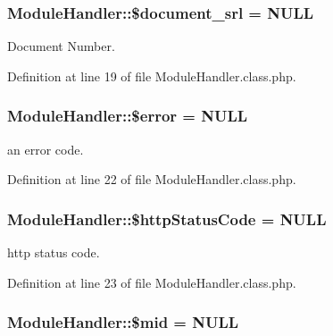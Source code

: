 \subsubsection[{\texorpdfstring{\$document\+\_\+srl}{$document_srl}}]{\setlength{\rightskip}{0pt plus 5cm}Module\+Handler\+::\$document\+\_\+srl = N\+U\+LL}\hypertarget{classModuleHandler_acf9f6062042025aab6a7e10f6b261909}{}\label{classModuleHandler_acf9f6062042025aab6a7e10f6b261909}


Document Number. 



Definition at line 19 of file Module\+Handler.\+class.\+php.

\subsubsection[{\texorpdfstring{\$error}{$error}}]{\setlength{\rightskip}{0pt plus 5cm}Module\+Handler\+::\$error = N\+U\+LL}\hypertarget{classModuleHandler_ad81b78f21e42724e73da6808c561159c}{}\label{classModuleHandler_ad81b78f21e42724e73da6808c561159c}


an error code. 



Definition at line 22 of file Module\+Handler.\+class.\+php.

\subsubsection[{\texorpdfstring{\$http\+Status\+Code}{$httpStatusCode}}]{\setlength{\rightskip}{0pt plus 5cm}Module\+Handler\+::\$http\+Status\+Code = N\+U\+LL}\hypertarget{classModuleHandler_a033e864206ca6a6494af015baa5d2365}{}\label{classModuleHandler_a033e864206ca6a6494af015baa5d2365}


http status code. 



Definition at line 23 of file Module\+Handler.\+class.\+php.

\subsubsection[{\texorpdfstring{\$mid}{$mid}}]{\setlength{\rightskip}{0pt plus 5cm}Module\+Handler\+::\$mid = N\+U\+LL}\hypertarget{classModuleHandler_a6bb7e9e29c0fb9893d051179281b093e}{}\label{classModuleHandler_a6bb7e9e29c0fb9893d051179281b093e}


